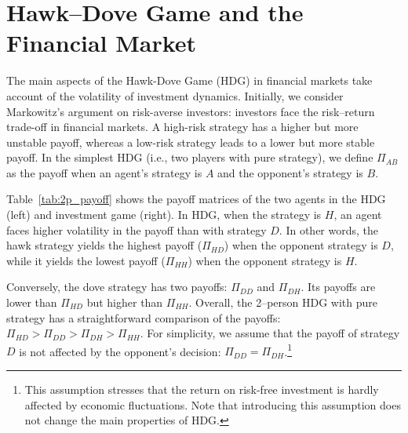 \documentclass[11pt,a4paper]{article}
\begin{document}


\bigskip 
\section{Hawk--Dove Game and the Financial Market}

The main aspects of the Hawk-Dove Game (HDG) in financial markets take account of the volatility of investment dynamics. Initially, we consider Markowitz's argument on risk-averse investors: investors face the risk--return trade-off in financial markets. A high-risk strategy has a higher but more unstable payoff, whereas a low-risk strategy leads to a lower but more stable payoff. In the simplest HDG (i.e., two players with pure strategy), we define $\Pi_{AB}$ as the payoff when an agent's strategy is $A$ and the opponent's strategy is $B$. 

Table~\ref{tab:2p_payoff} shows the payoff matrices of the two agents in the HDG (left) and investment game (right). In HDG, when the strategy is $H$, an agent faces higher volatility in the payoff than with strategy $D$. In other words, the hawk strategy yields the highest payoff ($\Pi_{HD}$) when the opponent strategy is $D$, while it yields the lowest payoff ($\Pi_{HH}$) when the opponent strategy is $H$. 

Conversely, the dove strategy has two payoffs: $\Pi_{DD}$ and $\Pi_{DH}$. Its payoffs are lower than $\Pi_{HD}$ but higher than $\Pi_{HH}$. Overall, the 2--person HDG with pure strategy has a straightforward comparison of the payoffs: $\Pi_{HD}>\Pi_{DD}>\Pi_{DH}>\Pi_{HH}$. For simplicity, we assume that the payoff of strategy $D$ is not affected by the opponent's decision: $\Pi_{DD}=\Pi_{DH}$.\footnote{This assumption stresses that the return on risk-free investment is hardly affected by economic fluctuations. Note that introducing this assumption does not change the main properties of HDG.} \\
\end{document}
